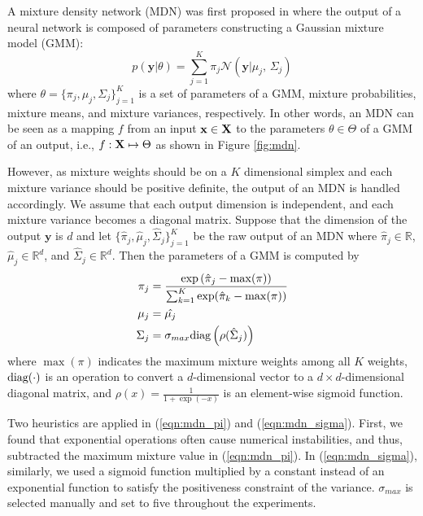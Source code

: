 \documentclass[letterpaper, 10 pt, conference]{ieeeconf}  %
\def\R{{\mathbb R}}
\def\Bx{\mathbf{x}} \def\By{\mathbf{y}} \def\Bp{\mathbf{p}}
\begin{document}
A mixture density network (MDN) was first proposed in \cite{Bishop_94}
where the output of a neural network is composed of 
parameters constructing a Gaussian mixture model (GMM):
\begin{equation*}
	p(\By|\theta) 
		= 
		\sum_{j=1}^K \pi_j \mathcal{N}(\By|\mu_j, \, \Sigma_j)
\end{equation*}
where $\theta = \{ \pi_j, \mu_j, \Sigma_j \}_{j=1}^K$ is a set of parameters
of a GMM, mixture probabilities, mixture means, and mixture variances, 
respectively. 
In other words, an MDN can be seen as a mapping $f$ from an input 
$\Bx \in \BX$
to the parameters $\theta \in \Theta$ of a GMM of an output, i.e., 
$f: \mathbf{X} \mapsto \Theta $ as shown in Figure \ref{fig:mdn}.

However, as mixture weights should be on a $K$ dimensional simplex
and each mixture variance should be positive definite, 
the output of an MDN is handled accordingly.
We assume that each output dimension is independent, 
and each mixture variance becomes a diagonal matrix.
Suppose that the dimension of the output $\By$ is $d$ 
and
let $\{ \hat{\pi}_j, \hat{\mu}_j, \hat{\Sigma}_j \}_{j=1}^K$
be the raw output of an MDN where 
$\hat{\pi}_j \in \R$, $\hat{\mu}_j \in \R^d$, and 
$\hat{\Sigma}_j \in \R^d$. 
Then the parameters of a GMM is computed by
\begin{align}
	\pi_j &= \frac{ \exp \left(
			 \hat{\pi}_j - \max(\pi) 
			 		\right) }
		{\sum_{k=1}^K \exp( \hat{\pi}_k -\max(\pi)  )} 
		\label{eqn:mdn_pi}
		\\
	\mu_j &= \hat{\mu_j} 
		\nonumber
		\\
	\Sigma_j &= \sigma_{max} {\textrm{diag}}
		\left(  \rho(\hat{\Sigma}_j)
		\right)
		\label{eqn:mdn_sigma}
\end{align}
where $\max(\pi)$ indicates the maximum mixture weights
among all $K$ weights, 
${\textrm{diag}}(\cdot)$ is an operation to convert a 
$d$-dimensional vector to a $d \times d$-dimensional diagonal matrix, 
and $\rho(x)=\frac{1}{1+\exp(-x)}$ 
is an element-wise sigmoid function.


Two heuristics are applied in (\ref{eqn:mdn_pi})
and (\ref{eqn:mdn_sigma}).
First, 
we found that exponential operations often cause
numerical instabilities, and thus, 
subtracted the maximum mixture value in (\ref{eqn:mdn_pi}). 
In (\ref{eqn:mdn_sigma}), similarly, 
we used a sigmoid function multiplied by a constant
instead of an exponential function 
to satisfy the positiveness constraint of the variance.
$\sigma_{max}$ is selected manually 
and set to five throughout the experiments. 
\end{document}
